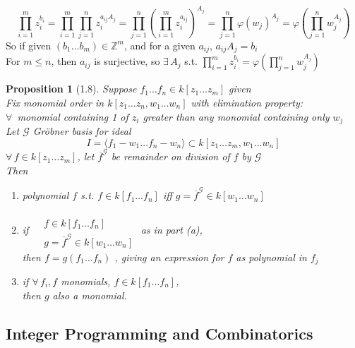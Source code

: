 \documentclass[10pt]{amsart}
\newtheorem{proposition}{Proposition}
\newcommand{\exercisehead}[1]
  { \smallskip
   \noindent{\small\bf Exercise #1.}
  }
\begin{document}
\begin{multicols*}{2}
\exercisehead{4} 
\[
\prod_{i=1}^m z_i^{b_i} = \prod_{i=1}^m \prod_{j=1}^n z_i^{ a_{ij} A_j } = \prod_{j=1}^n \left( \prod_{i=1}^m z_i^{a_{ij}} \right)^{A_j} = \prod_{j=1}^n \varphi(w_j)^{A_j} = \varphi\left( \prod_{j=1}^n w_j^{A_j} \right)
\]
So if given $(b_1 \dots b_m) \in \mathbb{Z}^m$, and for a given $a_{ij}$, $a_{ij}A_j = b_i$ \\

For $m\leq n$, then $a_{ij}$ is surjective, so $\exists \, A_j$ s.t. $\prod_{i=1}^m z_i^{b_i} = \varphi\left( \prod_{j=1}^n w_j^{A_j} \right)$



\begin{proposition}[1.8]
Suppose $f_1 \dots f_n \in k[z_1 \dots z_m]$ given \\
Fix monomial order in $k[z_1 \dots z_n, w_1 \dots w_n ]$ with elimination property: \\
$\forall \, $ monomial containing 1 of $z_i$ greater than any monomial containing only $w_j$ \\

Let $\mathcal{G}$ Gr\"{o}bner basis for ideal
\[
I = \langle f_1 - w_1 \dots f_n - w_n \rangle \subset k[z_1 \dots z_m, w_1 \dots w_n]
\]
$\forall \, f \in k[z_1 \dots z_m]$, let $\overline{f}^{ \mathcal{G}}$ be remainder on division of $f$ by $\mathcal{G}$ \\
Then
\begin{enumerate}
\item[(a)] polynomial $f$ s.t. $f\in k[f_1 \dots f_n]$ iff $g= \overline{f}^{ \mathcal{G}} \in k[w_1 \dots w_n]$
\item[(b)] if $\begin{aligned} & \quad \\
  & f \in k [f_1 \dots f_n ] \\
  & g = \overline{f}^{\mathcal{G}}\in k[ w_1 \dots w_n] \end{aligned}$ \quad as in part (a), \\

then $f = g(f_1 \dots f_n)$ , giving an expression for $f$ as polynomial in $f_j$
\item[(c)] if $\forall \, f_i, f$ monomials, $f\in k[f_1 \dots f_n]$, \\
then $g$ also a monomial.  
\end{enumerate}
\end{proposition}



\subsection{Integer Programming and Combinatorics}




\end{multicols*}
\end{document}
